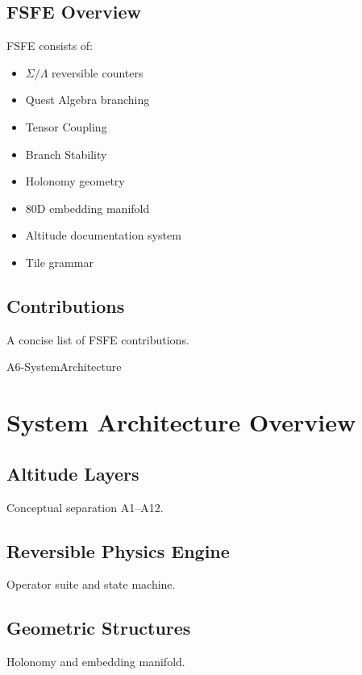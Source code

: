 \documentclass[11pt]{article}
\begin{document}
\subsection{FSFE Overview}
FSFE consists of:
\begin{itemize}
  \item $\Sigma/\Lambda$ reversible counters
  \item Quest Algebra branching
  \item Tensor Coupling
  \item Branch Stability
  \item Holonomy geometry
  \item 80D embedding manifold
  \item Altitude documentation system
  \item Tile grammar
\end{itemize}

\subsection{Contributions}
A concise list of FSFE contributions.

\newpage


\begin{citationmembrane}{A6-SystemArchitecture}
\end{citationmembrane}

\section{System Architecture Overview}

\subsection{Altitude Layers}
Conceptual separation A1--A12.

\subsection{Reversible Physics Engine}
Operator suite and state machine.

\subsection{Geometric Structures}
Holonomy and embedding manifold.
\end{document}
